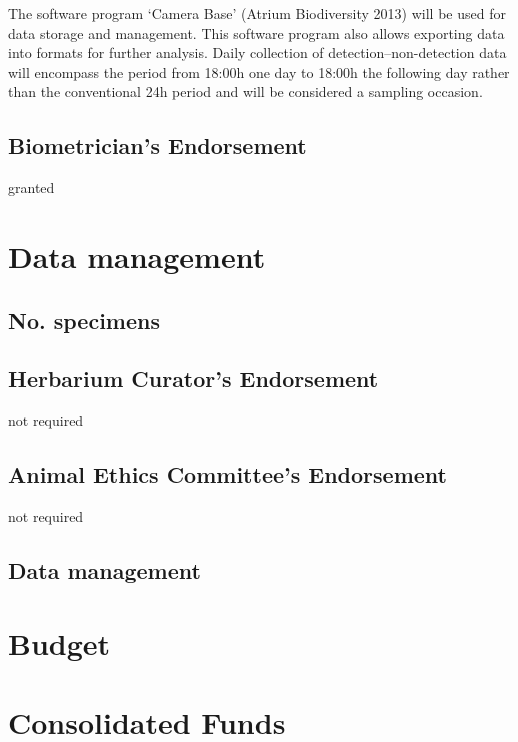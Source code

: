 \documentclass[version=last,
    paper=a4,                               %
    10pt,                                   %
    dvipsnames,
    oneside,                              %
    headings=openany,                       %
    open=any,
    BCOR=7mm,                               %
    DIV=15,     %
]{scrbook}
\begin{document}
The software program `Camera Base' (Atrium Biodiversity 2013) will be
used for data storage and management. This software program also allows
exporting data into formats for further analysis. Daily collection of
detection--non-detection data will encompass the period from 18:00h one
day to 18:00h the following day rather than the conventional 24h period
and will be considered a sampling occasion.




\subsection*{Biometrician's Endorsement}

granted



\section*{Data management}


\subsection*{No. specimens}






\subsection*{Herbarium Curator's Endorsement}

not required




\subsection*{Animal Ethics Committee's Endorsement}

not required




\subsection*{Data management}






\section*{Budget}

\section*{Consolidated Funds }
\end{document}
